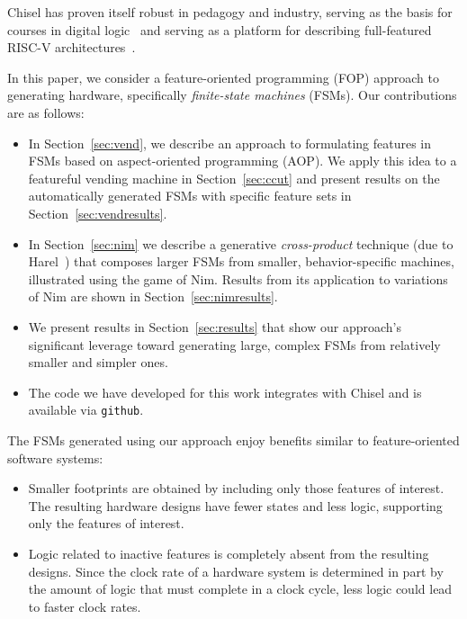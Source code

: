 \documentclass[conference]{IEEEtran}
\begin{document}
Chisel has proven itself robust in pedagogy and industry, serving as the basis for courses in digital logic~\cite{vlsicourse} and serving as a platform for describing full-featured RISC-V architectures~\cite{chisel:riscv}.  

In this paper, we consider a feature-oriented programming (FOP) approach to generating hardware, specifically \emph{finite-state machines} (FSMs).   Our contributions are as follows:
\begin{itemize}
    \item In Section~\ref{sec:vend}, we describe an approach to formulating features in FSMs based on aspect-oriented programming (AOP).  We apply this idea to a featureful vending machine in Section~\ref{sec:ccut} and present results on the automatically generated FSMs with specific feature sets in Section~\ref{sec:vendresults}.
    \item In Section~\ref{sec:nim} we describe a generative \emph{cross-product} technique (due to Harel~\cite{HAREL1987231}) that composes larger FSMs from smaller, behavior-specific machines, illustrated using the game of Nim.  Results from its application to variations of Nim are shown in Section~\ref{sec:nimresults}.
    \item We present results in Section~\ref{sec:results} that show our approach's significant leverage toward generating large, complex FSMs from relatively smaller and simpler ones. 
    \item The code we have developed for this work integrates with Chisel and is available via \texttt{github}.
\end{itemize}
The FSMs generated using our approach enjoy benefits similar to feature-oriented software systems:
\begin{itemize}
    \item Smaller footprints are obtained by including only those features of interest.  The resulting hardware designs have fewer states and less logic, supporting only the features of interest.
    \item Logic related to inactive features is completely absent from the resulting designs. Since the clock rate of a hardware system is determined in part by the amount of logic that must complete in a clock cycle, less logic could lead to faster clock rates.
\end{itemize}
\end{document}
